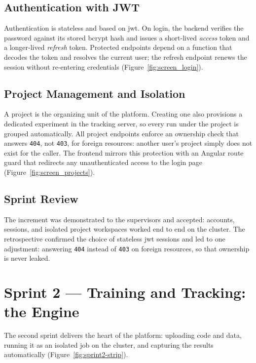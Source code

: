 \subsection{Authentication with JWT}
Authentication is stateless and based on \gls{jwt}. On login, the backend
verifies the password against its stored bcrypt hash and issues a short-lived
\emph{access} token and a longer-lived \emph{refresh} token. Protected
endpoints depend on a function that decodes the token and resolves the current
user; the refresh endpoint renews the session without re-entering credentials
(Figure~\ref{fig:screen_login}).


\subsection{Project Management and Isolation}
A project is the organizing unit of the platform. Creating one also provisions
a dedicated experiment in the tracking server, so every run under the project
is grouped automatically. All project endpoints enforce an ownership check
that answers \texttt{404}, not \texttt{403}, for foreign resources: another
user's project simply does not exist for the caller. The frontend mirrors this
protection with an Angular route guard that redirects any unauthenticated
access to the login page (Figure~\ref{fig:screen_projects}).


\subsection{Sprint Review}
The increment was demonstrated to the supervisors and accepted: accounts,
sessions, and isolated project workspaces worked end to end on the cluster.
The retrospective confirmed the choice of stateless \gls{jwt} sessions and led
to one adjustment: answering \texttt{404} instead of \texttt{403} on foreign
resources, so that ownership is never leaked.

\section{Sprint 2 --- Training and Tracking: the Engine}
\label{sec:sprint2}
The second sprint delivers the heart of the platform: uploading code and data,
running it as an isolated job on the cluster, and capturing the results
automatically (Figure~\ref{fig:sprint2-strip}).

